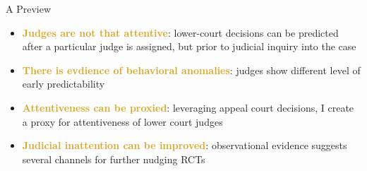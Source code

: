 \begin{frame}{{A Preview}}

    \begin{itemize}
        \item<+-> \textcolor{goldenrod}{\textbf{Judges are not that attentive}}: lower-court decisions can be predicted after a particular judge is assigned, but prior to judicial inquiry into the case
        \item<+-> \textcolor{goldenrod}{\textbf{There is evdience of behavioral anomalies}}: judges show different level of early predictability
        \item<+-> \textcolor{goldenrod}{\textbf{Attentiveness can be proxied}}: leveraging appeal court decisions, I create a proxy for attentiveness of lower court judges
        \item<+-> \textcolor{goldenrod}{\textbf{Judicial inattention can be improved}}: observational evidence suggests several channels for further nudging RCTs 
    \end{itemize}
        
\end{frame}

